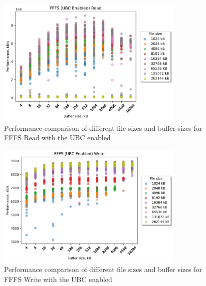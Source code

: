 \begin{figure}[!htb]
	\label{fig:bench_fffs_no_ubc_scatter_read}
	\begin{center}
		\includegraphics[width=0.8\textwidth]{figures.nosync/benchmarking/FFFS/scatter-UBC Enabled-Read.pdf}
	\end{center}
	\caption[Comparison of Read performance for file size and buffer size of FFFS with the UBC disabled]{Performance comparison of different file sizes and buffer sizes for FFFS Read with the UBC enabled}
\end{figure}
\begin{figure}[!htb]
	\label{fig:bench_fffs_no_ubc_scatter_write}
	\begin{center}
		\includegraphics[width=0.8\textwidth]{figures.nosync/benchmarking/FFFS/scatter-UBC Enabled-Write.pdf}
	\end{center}
	\caption[Comparison of Write performance for file size and buffer size of FFFS with the UBC disabled]{Performance comparison of different file sizes and buffer sizes for FFFS Write with the UBC enabled}
\end{figure}
\clearpage

